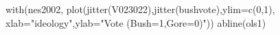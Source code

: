 \begin{Schunk}
\begin{Sinput}
 with(nes2002, plot(jitter(V023022),jitter(bushvote),ylim=c(0,1), 
  xlab="ideology",ylab="Vote (Bush=1,Gore=0)"))
 abline(ols1)
\end{Sinput}
\end{Schunk}
